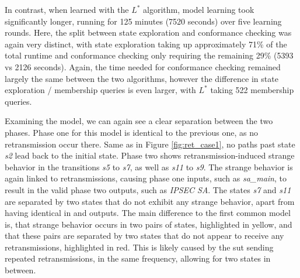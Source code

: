In contrast, when learned with the $L^*$ algorithm, model learning took significantly longer, running for 125 minutes (7520 seconds) over five learning rounds. Here, the split between state exploration and conformance checking was again very distinct, with state exploration taking up approximately 71\% of the total runtime and conformance checking only requiring the remaining 29\% (5393 vs 2126 seconds). Again, the time needed for conformance checking remained largely the same between the two algorithms, however the difference in state exploration / membership queries is even larger, with $L^*$ taking 522 membership queries.

Examining the model, we can again see a clear separation between the two phases. Phase one for this model is identical to the previous one, as no retransmission occur there. Same as in Figure \ref{fig:ret_case1}, no paths past state \emph{s2} lead back to the initial state. Phase two shows retransmission-induced strange behavior in the transitions \emph{s5} to \emph{s7}, as well as \emph{s11} to \emph{s9}. The strange behavior is again linked to retransmissions, causing phase one inputs, such as \emph{sa\_main}, to result in the valid phase two outputs, such as \emph{IPSEC SA}. The states \emph{s7} and \emph{s11} are separated by two states that do not exhibit any strange behavior, apart from having identical in and outputs. The main difference to the first common model is, that strange behavior occurs in two pairs of states, highlighted in yellow, and that these pairs are separated by two states that do not appear to receive any retransmissions, highlighted in red. This is likely caused by the \ac{sut} sending repeated retransmissions, in the same frequency, allowing for two states in between. 

